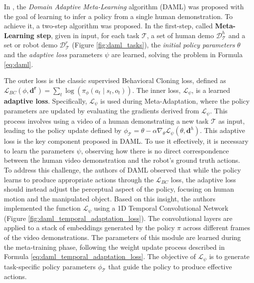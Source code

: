 In \cite{yu2018daml}, the \textit{Domain Adaptive Meta-Learning} algorithm (DAML) was proposed with the goal of learning to infer a policy from a single human demonstration. To achieve it, a two-step algorithm was proposed. In the first-step, called \textbf{Meta-Learning step}, given in input, for each task $\mathcal{T}$, a set of human demo $\mathcal{D}^{h}_{\mathcal{T}}$ and a set or robot demo $\mathcal{D}^{r}_{\mathcal{T}}$ (Figure \ref{fig:daml_tasks}), the \textit{initial policy parameters} $\theta$ and the \textit{adaptive loss} parameters $\psi$ are learned, solving the problem in Formula \ref{eq:daml}.

\newline The outer loss is the classic supervised Behavioral Cloning loss, defined as $\mathcal{L}_{BC}(\phi, \mathbf{d^{r}}) = \sum_{t} \log(\pi_{\phi}(a_{t} \mid s_{t}, o_{t}))$. The inner loss, $\mathcal{L}_{\psi}$, is a learned \textbf{adaptive loss}. Specifically, $\mathcal{L}_{\psi}$ is used during Meta-Adaptation, where the policy parameters are updated by evaluating the gradients derived from $\mathcal{L}_{\psi}$. This process involves using a video of a human demonstrating a new task $\mathcal{T}$ as input, leading to the policy update defined by $\phi_{\mathcal{T}} = \theta - \alpha \nabla_{\theta} \mathcal{L}_{\psi}(\theta, \mathbf{d}^{h})$. 
\newline This adaptive loss is the key component proposed in DAML. To use it effectively, it is necessary to learn the parameters $\psi$, observing how there is no direct correspondence between the human video demonstration and the robot's ground truth actions. To address this challenge, the authors of DAML observed that while the policy learns to produce appropriate actions through the $\mathcal{L}_{BC}$ loss, the adaptive loss should instead adjust the perceptual aspect of the policy, focusing on human motion and the manipulated object. Based on this insight, the authors implemented the function $\mathcal{L}_{\psi}$ using a 1D Temporal Convolutional Network (Figure \ref{fig:daml_temporal_adaptation_loss}). The convolutional layers are applied to a stack of embeddings generated by the policy $\pi$ across different frames of the video demonstrations. The parameters of this module are learned during the meta-training phase, following the weight update process described in Formula \ref{eq:daml_temporal_adaptation_loss}. The objective of $\mathcal{L}_{\psi}$ is to generate task-specific policy parameters $\phi_{\mathcal{T}}$ that guide the policy to produce effective actions.

